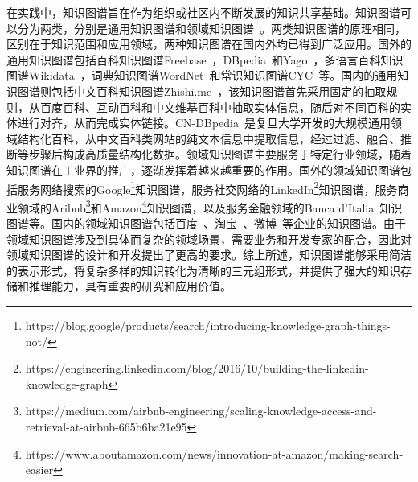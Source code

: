 \documentclass[algorithmlist, AutoFakeBold, AutoFakeSlant, figurelist, tablelist, nomlist, engineering]{seuthesix}
\begin{document}
在实践中，知识图谱旨在作为组织或社区内不断发展的知识共享基础。知识图谱可以分为两类，分别是通用知识图谱和领域知识图谱~\cite{hogan2021knowledge}。两类知识图谱的原理相同，区别在于知识范围和应用领域，两种知识图谱在国内外均已得到广泛应用。国外的通用知识图谱包括百科知识图谱Freebase~\cite{bollacker2007platform}，DBpedia~\cite{lehmann2015dbpedia}和Yago~\cite{hoffart2011yago2}，多语言百科知识图谱Wikidata~\cite{vrandevcic2014wikidata}，词典知识图谱WordNet~\cite{miller2007wordnet}和常识知识图谱CYC~\cite{lenat1995cyc}等。国内的通用知识图谱则包括中文百科知识图谱Zhishi.me~\cite{niu2011zhishi}，该知识图谱首先采用固定的抽取规则，从百度百科、互动百科和中文维基百科中抽取实体信息，随后对不同百科的实体进行对齐，从而完成实体链接。CN-DBpedia~\cite{xu2017cn}是复旦大学开发的大规模通用领域结构化百科，从中文百科类网站的纯文本信息中提取信息，经过过滤、融合、推断等步骤后构成高质量结构化数据。领域知识图谱主要服务于特定行业领域，随着知识图谱在工业界的推广，逐渐发挥着越来越重要的作用。国外的领域知识图谱包括服务网络搜索的Google\footnote{https://blog.google/products/search/introducing-knowledge-graph-things-not/}知识图谱，服务社交网络的LinkedIn\footnote{https://engineering.linkedin.com/blog/2016/10/building-the-linkedin-knowledge-graph}知识图谱，服务商业领域的Aribnb\footnote{https://medium.com/airbnb-engineering/scaling-knowledge-access-and-retrieval-at-airbnb-665b6ba21e95}和Amazon\footnote{https://www.aboutamazon.com/news/innovation-at-amazon/making-search-easier}知识图谱，以及服务金融领域的Banca d’Italia~\cite{bellomarini2019knowledge}知识图谱等。国内的领域知识图谱包括百度~\cite{wang2013xlore}、淘宝~\cite{xu2021alime}、微博~\cite{wei2020analysis}等企业的知识图谱。由于领域知识图谱涉及到具体而复杂的领域场景，需要业务和开发专家的配合，因此对领域知识图谱的设计和开发提出了更高的要求。综上所述，知识图谱能够采用简洁的表示形式，将复杂多样的知识转化为清晰的三元组形式，并提供了强大的知识存储和推理能力，具有重要的研究和应用价值。
\end{document}
